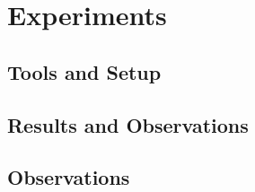 \section{Experiments}
\label{ch:experiments}



\subsection{Tools and Setup}


\subsection{Results and Observations}


\subsection{Observations}

